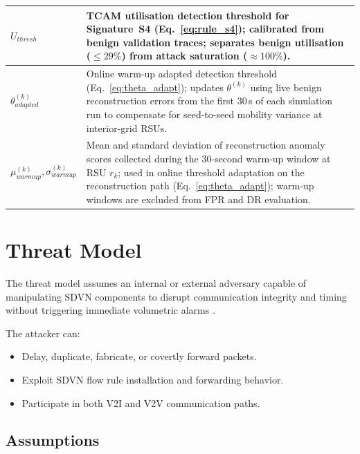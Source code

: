 \documentclass[12pt, a4paper]{report}
\begin{document}
\begin{longtable}{|m{5.0cm}|m{9.0cm}|}
\hline
$U_{thresh}$ & TCAM utilisation detection threshold for Signature~S4 (Eq.~\ref{eq:rule_s4}); calibrated from benign validation traces; separates benign utilisation ($\leq 29\%$) from attack saturation ($\approx 100\%$). \\
\hline
$\theta^{(k)}_{adapted}$ &
Online warm-up adapted detection threshold
(Eq.~\ref{eq:theta_adapt}); updates
$\theta^{(k)}$ using live benign reconstruction
errors from the first 30\,s of each simulation
run to compensate for seed-to-seed mobility
variance at interior-grid \ac{RSU}s. \\
\hline
$\mu_{warmup}^{(k)}, \sigma_{warmup}^{(k)}$ &
Mean and standard deviation of reconstruction
anomaly scores collected during the 30-second
warm-up window at \ac{RSU} $r_k$; used in online
threshold adaptation on the reconstruction path
(Eq.~\ref{eq:theta_adapt}); warm-up windows are
excluded from \ac{FPR} and \ac{DR} evaluation. \\
\hline
\end{longtable}
\endgroup
\section{Threat Model}
The threat model assumes an internal or external adversary capable of manipulating SDVN components to disrupt communication integrity and timing without triggering immediate volumetric alarms \cite{PASCOAL2020107223}\cite{DBLP:journals/air/QammarKND23}.

The attacker can:
\begin{itemize}
  \item Delay, duplicate, fabricate, or covertly forward packets.
  \item Exploit SDVN flow rule installation and forwarding behavior.
  \item Participate in both V2I and V2V communication paths\cite{app10093217}.
\end{itemize}

\subsection{Assumptions}
\end{document}
